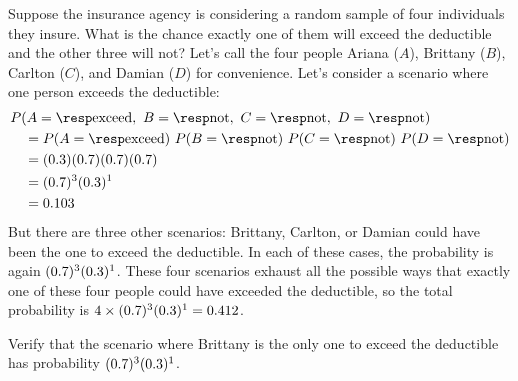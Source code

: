\begin{examplewrap}
\begin{nexample}{Suppose the insurance agency is considering
    a random sample of four individuals they insure.
    What is the chance exactly one of them will exceed
    the deductible and the other three will not?
    Let's call the four people
    Ariana ($A$),
    Brittany ($B$),
    Carlton ($C$),
    and Damian ($D$)
    for convenience.}
  \label{insureOneOfFourExceedsDeductible}%
  Let's consider a scenario where one person exceeds
  the deductible:
  \begin{align*}
  &P(A=\text{\insureF{}},
      \text{ }B=\text{\insureS{}},
      \text{ }C=\text{\insureS{}},
      \text{ }D=\text{\insureS{}}) \\
    &\quad = P(A=\text{\insureF{}})\ 
        P(B=\text{\insureS{}})\ 
        P(C=\text{\insureS{}})\ 
        P(D=\text{\insureS{}}) \\
    &\quad =  (\insureFprob{})
        (\insureSprob{})
        (\insureSprob{})
        (\insureSprob{}) \\
    &\quad = (\insureSprob{})^3 (\insureFprob{})^1 \\
    &\quad = \insureBinomCinDSingleScenario{}
  \end{align*}
  But there are three other scenarios: Brittany, Carlton,
  or Damian could have been the one to exceed the deductible.
  In each of these cases, the probability is again
  $(0.7{})^3 (0.3{})^1$.
  These four scenarios exhaust all the possible ways that
  exactly one of these four people could have exceeded
  the deductible, so the total probability is
  $4 \times (0.7{})^3 (0.3{})^1
      = 0.412{}$.
\end{nexample}
\end{examplewrap}

\begin{exercisewrap}
\begin{nexercise}
Verify that the scenario where Brittany is the only one
to exceed the deductible has probability
$(0.7{})^3 (0.3{})^1$.~\footnotemark{}
\end{nexercise}
\end{exercisewrap}


